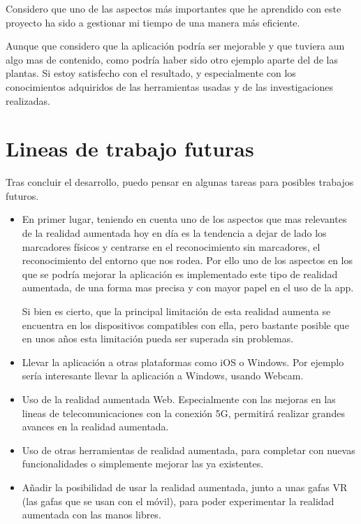 Considero que uno de las aspectos más importantes que he aprendido con este proyecto ha sido a gestionar mi tiempo de una manera más eficiente.

Aunque que considero que la aplicación podría ser mejorable y que tuviera aun algo mas de contenido, como podría haber sido otro ejemplo aparte del de las plantas. Si estoy satisfecho con el resultado, y especialmente con los conocimientos adquiridos de las herramientas usadas y de las investigaciones realizadas.

\section{Lineas de trabajo futuras}
Tras concluir el desarrollo, puedo pensar en algunas tareas para posibles trabajos futuros.
\begin{itemize}
	\item En primer lugar, teniendo en cuenta uno de los aspectos que mas relevantes de la realidad aumentada hoy en día es la tendencia a dejar de lado los marcadores físicos y centrarse en el reconocimiento sin marcadores, el reconocimiento del entorno que nos rodea.
	Por ello uno de los aspectos en los que se podría mejorar la aplicación es implementado este tipo de realidad aumentada, de una forma mas precisa y con mayor papel en el uso de la app.
	
	Si bien es cierto, que la principal limitación de esta realidad aumenta se encuentra en los dispositivos compatibles con ella, pero bastante posible que en unos años esta limitación pueda ser superada sin problemas.
	\item Llevar la aplicación a otras plataformas como iOS o Windows. Por ejemplo sería interesante llevar la aplicación a Windows, usando Webcam.
	\item Uso de la realidad aumentada Web. Especialmente con las mejoras en las lineas de telecomunicaciones con la conexión 5G, permitirá realizar grandes avances en la realidad aumentada.
	\item Uso de otras herramientas de realidad aumentada, para completar con nuevas funcionalidades o simplemente mejorar las ya existentes.
	\item Añadir la posibilidad de usar la realidad aumentada, junto a unas gafas VR (las gafas que se usan con el móvil), para poder experimentar la realidad aumentada con las manos libres. 
	
\end{itemize}

